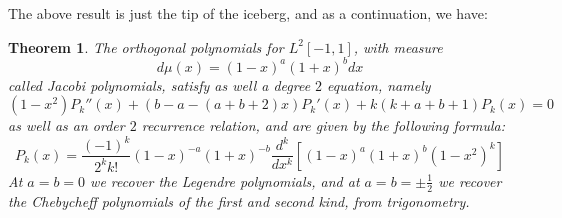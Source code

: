 \documentclass[12pt]{amsbook}
\newtheorem{theorem}{Theorem}[chapter]
\begin{document}
The above result is just the tip of the iceberg, and as a continuation, we have:


\begin{theorem}
The orthogonal polynomials for $L^2[-1,1]$, with measure
$$d\mu(x)=(1-x)^a(1+x)^bdx$$
called Jacobi polynomials, satisfy as well a degree $2$ equation, namely
$$(1-x^2)P_k''(x)+(b-a-(a+b+2)x)P_k'(x)+k(k+a+b+1)P_k(x)=0$$
as well as an order $2$ recurrence relation, and are given by the following formula:
$$P_k(x)=\frac{(-1)^k}{2^kk!}(1-x)^{-a}(1+x)^{-b}\frac{d^k}{dx^k}\left[(1-x)^a(1+x)^b(1-x^2)^k\right]$$
At $a=b=0$ we recover the Legendre polynomials, and at $a=b=\pm\frac{1}{2}$ we recover the Chebycheff polynomials of the first and second kind, from trigonometry. 
\end{theorem}
\end{document}
